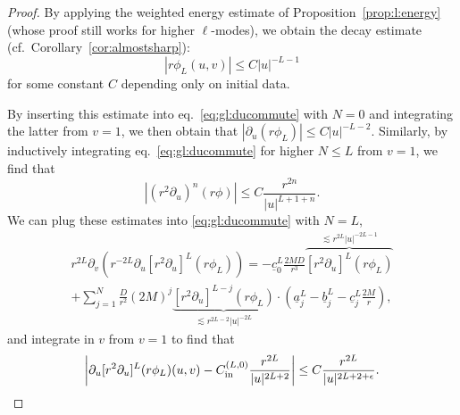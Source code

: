 \documentclass[11pt,english]{article}
\numberwithin{equation}{section}
\theoremstyle{remark}
\theoremstyle{plain}
\theoremstyle{remark}
\newcommand{\pu}{\partial_u}
\newcommand{\pv}{\partial_v}
\renewcommand{\(}{\left(}
\renewcommand{\)}{\right)}
\begin{document}
\begin{proof}
By applying the weighted energy estimate of Proposition~\ref{prop:l:energy} (whose proof still works for higher $\ell$-modes), we obtain the decay estimate (cf.\ Corollary~\ref{cor:almostsharp}):
\begin{equation}\label{eq:cli:1}
|r\phi_L(u,v)|\leq C|u|^{-L-1}
\end{equation}
for some constant $C$ depending only on initial data.

By inserting this estimate into eq.\ \eqref{eq:gl:ducommute} with $N=0$ and integrating the latter from $v=1$, we then obtain that $|\pu(r\phi_L)|\leq C|u|^{-L-2}$.
Similarly, by inductively integrating eq.\ \eqref{eq:gl:ducommute} for higher $N\leq L$ from $v=1$, we find that 
\begin{equation}\label{eq:cli:2}
|(r^2\pu)^n(r\phi)|\leq C\frac{r^{2n}}{|u|^{L+1+n}}.
\end{equation}
We can plug these estimates into \eqref{eq:gl:ducommute} with $N=L$, 
\begin{multline}\label{proofnl1}
	r^{2L}\pv(r^{-2L}\pu[r^2\pu]^L(r\phi_L))=-\underline{c}_0^L\frac{2MD}{r^3}\overbrace{[r^2\pu]^L(r\phi_L)}^{\lesssim r^{2L}|u|^{-2L-1}}\\
	+\sum_{j=1}^N\frac{D}{r^2}(2M)^j\underbrace{[r^2\pu]^{L-j}(r\phi_L)}_{\lesssim r^{2L-2}|u|^{-2L}}\cdot \left(	\underline{a}_j^L-\underline{b}_j^L-\underline{c}_j^L\frac{2M}{r}	\right), 
\end{multline}
and integrate in $v$ from $v=1$ to find that 
\begin{equation}\label{proofnl:Phipast}
\left|\pu[r^2\pu]^{L}(r\phi_L)(u,v)-\cl{0}\frac{r^{2L}}{|u|^{2L+2}}\right|\leq C\frac{r^{2L}}{|u|^{2L+2+\epsilon}}.
\end{equation}


\end{proof}
\end{document}
